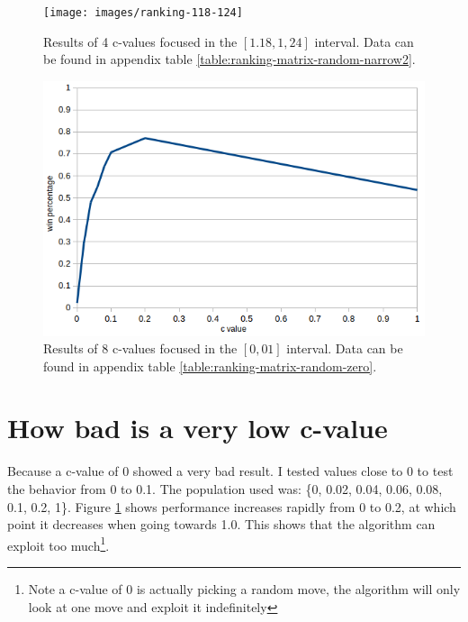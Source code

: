 \documentclass[
11pt, %
english, %
singlespacing, %
headsepline, %
]{MastersDoctoralThesis} %
\begin{document}
\vfill
\pagebreak
\begin{figure}[h]
	\captionsetup{width=.45\textwidth}
	\begin{minipage}[t]{0.5\textwidth}
		\centering
		\texttt{[image: images/ranking-118-124]}
		\caption{Results of 4 c-values focused in the $[1.18,1,24]$ interval. Data can be found in appendix table \ref{table:ranking-matrix-random-narrow2}.}
		\label{fig:results-rank-0-01}
	\end{minipage}
	\begin{minipage}[t]{0.5\textwidth}
		\centering
		\includegraphics[width=\textwidth]{images/rank-0-01}
		\caption{Results of 8 c-values focused in the $[0,01]$ interval. Data can be found in appendix table \ref{table:ranking-matrix-random-zero}.}
		\label{fig:results-rank-0-01}
	\end{minipage}
\end{figure}

\section{How bad is a very low c-value}
Because a c-value of 0 showed a very bad result. I tested values close to 0 to test the behavior from 0 to 0.1. The population used was: \{0, 0.02, 0.04, 0.06, 0.08, 0.1, 0.2, 1\}. Figure \ref{fig:results-rank-0-01} shows performance increases rapidly from 0 to 0.2, at which point it decreases when going towards 1.0. This shows that the algorithm can exploit too much\footnote{Note a c-value of 0 is actually picking a random move, the algorithm will only look at one move and exploit it indefinitely}.
\end{document}
